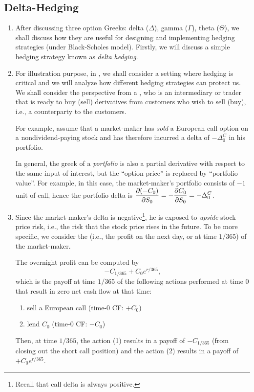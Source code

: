\subsection{Delta-Hedging}
\label{subsect:delta-hedging}
\begin{enumerate}
\item After discussing three option Greeks: delta (\(\Delta\)), gamma
(\(\Gamma\)), theta (\(\Theta\)), we shall discuss how they are useful for
designing and implementing hedging strategies (under Black-Scholes model).
Firstly, we will discuss a simple hedging strategy known as \emph{delta
hedging}.

\item For illustration purpose, in , we shall
consider a setting where hedging is critical and we will analyze how different
hedging strategies can protect us. We shall consider the perspective from a
, who is an intermediary or trader that is ready to buy
(sell) derivatives from customers who wish to sell (buy), i.e., a counterparty
to the customers.

For example, assume that a market-maker has \emph{sold} a European call option
on a nondividend-paying stock and has therefore incurred a delta of
\(-\Delta_0^C\) in his portfolio.

\begin{note}
In general, the greek of a \emph{portfolio} is also a partial derivative with
respect to the same input of interest, but the ``option price'' is replaced by
``portfolio value''. For example, in this case, the market-maker's portfolio
consists of \(-1\) unit of call, hence the portfolio delta is
\(\displaystyle \pdv{(-C_0)}{S_0}=-\pdv{C_0}{S_0}=-\Delta_0^C\).
\end{note}

\item Since the market-maker's delta is negative\footnote{Recall that call delta is
always positive.}, he is exposed to \emph{upside} stock price risk, i.e., the
risk that the stock price rises in the future. To be more specific, we consider
the  (i.e., the profit on the next day, or at time
\(1/365\)) of the market-maker.

The overnight profit can be computed by
\[
-C_{1/365}+C_0e^{r/365},
\]
which is the payoff at time \(1/365\) of the following actions performed at
time 0 that result in zero net cash flow at that time:
\begin{enumerate}[label={(\arabic*)}]
\item sell a European call (time-0 CF: \(+C_0\))
\item lend \(C_0\) (time-0 CF: \(-C_0\))
\end{enumerate}
Then, at time \(1/365\), the action (1) results in a payoff of \(-C_{1/365}\)
(from closing out the short call position) and the action (2) results in a
payoff of \(+C_0e^{r/365}\).


\end{enumerate}
